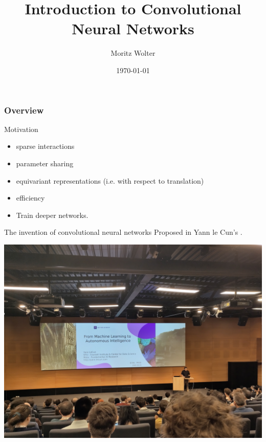 \documentclass{beamer}
\title{Introduction to Convolutional Neural Networks}
\date{\today}
\institute{High Performance Computing and Analytics Lab, University of Bonn}
\author{Moritz Wolter}
\begin{document}
    \maketitle

    \begin{frame}
    \frametitle{Overview} 
    \tableofcontents
    \end{frame}

    \begin{frame}{Motivation \cite{goodfellow2016deep}}
        \begin{itemize}
            \item sparse interactions
            \item parameter sharing
            \item equivariant representations (i.e. with respect to translation)
            \item efficiency
            \item Train deeper networks.
        \end{itemize}
    \end{frame}

    \begin{frame}{The invention of convolutional neural networks}
        Proposed in Yann le Cun's \cite{lecun1989handwritten}.
        
        \includegraphics[width=.8\linewidth]{figures/IMG_20220923_090433.jpg}
    \end{frame}
\end{document}
